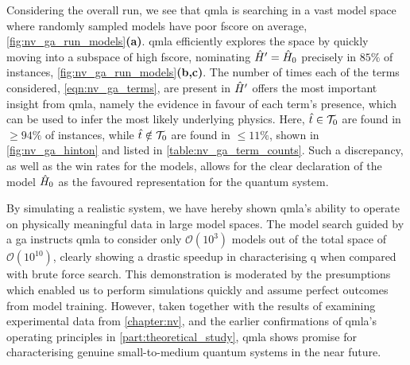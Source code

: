 Considering the overall \gls{run}, 
    we see that \gls{qmla} is searching in a vast \gls{model space} where randomly sampled models
    have poor \gls{fscore} on average, \cref{fig:nv_ga_run_models}\textbf{(a)}. 
\gls{qmla} efficiently explores the space by quickly moving into a 
    subspace of high \gls{fscore}, nominating $\hat{H}^{\prime} = \hat{H}_0$ precisely in $85\%$ of instances,
    \cref{fig:nv_ga_run_models}\textbf{(b,c)}.
The number of times each of the terms considered, \cref{eqn:nv_ga_terms}, 
    are present in $\hat{H}^{\prime}$ offers the most important insight from \gls{qmla}, 
    namely the evidence in favour of each term's presence, 
    which can be used to infer the most likely underlying physics. 
Here, $\hat{t} \in \mathcal{T}_0$ are found in $\geq 94\%$ of instances, 
    while $\hat{t} \notin \mathcal{T}_0$ are found in $\leq 11\%$, 
    shown in \cref{fig:nv_ga_hinton} and listed in \cref{table:nv_ga_term_counts}.
Such a discrepancy, as well as the \glspl{win rate} for the models, 
    allows for the clear declaration of the model $\hat{H}_0$ as the favoured representation 
    for the quantum system. 
\par 

By simulating a realistic system, we have hereby shown \gls{qmla}'s ability to operate on physically meaningful data
    in large \glspl{model space}. 
The \gls{model search} guided by a \gls{ga} instructs \gls{qmla} to consider only $\mathcal{O}(10^3)$ models out of the 
    total space of $\mathcal{O}(10^{10})$, 
    clearly showing a drastic speedup in characterising \gls{q} when compared with brute force search.
This demonstration is moderated by the presumptions which enabled us to perform simulations quickly
    and assume perfect outcomes from model training. 
However, taken together with the results of examining experimental data from \cref{chapter:nv}, 
    and the earlier confirmations of \gls{qmla}'s operating principles in \cref{part:theoretical_study}, 
    \gls{qmla} shows promise for characterising genuine small-to-medium quantum systems in the near future. 

